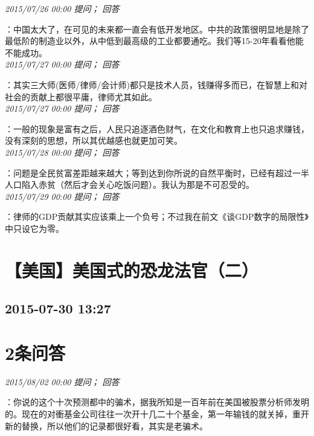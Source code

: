 \documentclass[twocolumn]{ctexart}
\begin{document}
\textit{\hfill\noindent\small 2015/07/26 00:00 提问； 回答}

：中国太大了，在可见的未来都一直会有低开发地区。中共的政策很明显地是除了最低阶的制造业以外，从中低到最高级的工业都要通吃。我们等15-20年看看他能不能成功。\\

\textit{\hfill\noindent\small 2015/07/27 00:00 提问； 回答}

：其实三大师(医师/律师/会计师)都只是技术人员，钱赚得多而已，在智慧上和对社会的贡献上都很平庸，律师尤其如此。\\

\textit{\hfill\noindent\small 2015/07/27 00:00 提问； 回答}

：一般的现象是富有之后，人民只追逐酒色财气，在文化和教育上也只追求赚钱，没有深刻的思想，所以其优越感也就更加可笑。\\

\textit{\hfill\noindent\small 2015/07/28 00:00 提问； 回答}

：问题是全民贫富差距越来越大；等到达到你所说的自然平衡时，已经有超过一半人口陷入赤贫（然后才会关心吃饭问题）。我认为那是不可忍受的。\\

\textit{\hfill\noindent\small 2015/07/29 00:00 提问； 回答}

：律师的GDP贡献其实应该乘上一个负号；不过我在前文《谈GDP数字的局限性》中只设它为零。\\


\section{【美国】美国式的恐龙法官（二）}
\subsection{2015-07-30 13:27}


\section{2条问答}

\textit{\hfill\noindent\small 2015/08/02 00:00 提问； 回答}

：你说的这个十次预测都中的骗术，据我所知是一百年前在美国被股票分析师发明的。现在的对衝基金公司往往一次开十几二十个基金，第一年输钱的就关掉，重开新的替换，所以他们的记录都很好看，其实是老骗术。
\end{document}

